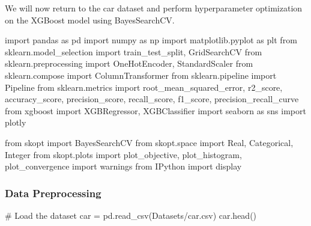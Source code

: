 \documentclass[
  letterpaper,
  DIV=11,
  numbers=noendperiod]{scrreprt}
\newenvironment{Shaded}{\begin{snugshade}}{\end{snugshade}}
\newcommand{\CommentTok}[1]{\textcolor[rgb]{0.37,0.37,0.37}{#1}}
\newcommand{\ImportTok}[1]{\textcolor[rgb]{0.00,0.46,0.62}{#1}}
\newcommand{\NormalTok}[1]{\textcolor[rgb]{0.00,0.23,0.31}{#1}}
\newcommand{\OperatorTok}[1]{\textcolor[rgb]{0.37,0.37,0.37}{#1}}
\newcommand{\StringTok}[1]{\textcolor[rgb]{0.13,0.47,0.30}{#1}}
\begin{document}
We will now return to the car dataset and perform hyperparameter
optimization on the XGBoost model using BayesSearchCV.

\begin{Shaded}
\begin{Highlighting}[]
\ImportTok{import}\NormalTok{ pandas }\ImportTok{as}\NormalTok{ pd}
\ImportTok{import}\NormalTok{ numpy }\ImportTok{as}\NormalTok{ np}
\ImportTok{import}\NormalTok{ matplotlib.pyplot }\ImportTok{as}\NormalTok{ plt}
\ImportTok{from}\NormalTok{ sklearn.model\_selection }\ImportTok{import}\NormalTok{ train\_test\_split, GridSearchCV}
\ImportTok{from}\NormalTok{ sklearn.preprocessing }\ImportTok{import}\NormalTok{ OneHotEncoder, StandardScaler}
\ImportTok{from}\NormalTok{ sklearn.compose }\ImportTok{import}\NormalTok{ ColumnTransformer}
\ImportTok{from}\NormalTok{ sklearn.pipeline }\ImportTok{import}\NormalTok{ Pipeline}
\ImportTok{from}\NormalTok{ sklearn.metrics }\ImportTok{import}\NormalTok{ root\_mean\_squared\_error, r2\_score, accuracy\_score, precision\_score, recall\_score, f1\_score, precision\_recall\_curve}
\ImportTok{from}\NormalTok{ xgboost }\ImportTok{import}\NormalTok{ XGBRegressor, XGBClassifier}
\ImportTok{import}\NormalTok{ seaborn }\ImportTok{as}\NormalTok{ sns}
\ImportTok{import}\NormalTok{ plotly}

\ImportTok{from}\NormalTok{ skopt }\ImportTok{import}\NormalTok{ BayesSearchCV}
\ImportTok{from}\NormalTok{ skopt.space }\ImportTok{import}\NormalTok{ Real, Categorical, Integer}
\ImportTok{from}\NormalTok{ skopt.plots }\ImportTok{import}\NormalTok{ plot\_objective, plot\_histogram, plot\_convergence}
\ImportTok{import}\NormalTok{ warnings}
\ImportTok{from}\NormalTok{ IPython }\ImportTok{import}\NormalTok{ display}
\end{Highlighting}
\end{Shaded}

\subsubsection{Data Preprocessing}\label{data-preprocessing}

\begin{Shaded}
\begin{Highlighting}[]
\CommentTok{\# Load the dataset}
\NormalTok{car }\OperatorTok{=}\NormalTok{ pd.read\_csv(}\StringTok{\textquotesingle{}Datasets/car.csv\textquotesingle{}}\NormalTok{)}
\NormalTok{car.head()}
\end{Highlighting}
\end{Shaded}
\end{document}
